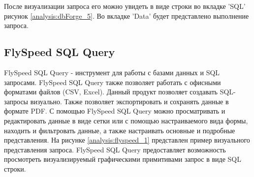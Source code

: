 \begin{figure}[ht!]
\end{figure}   

\newpage

После визуализации запроса его можно увидеть в виде строки во вкладке 'SQL' рисунок \ref{analysis:dbForge_5}. 
Во вкладке 'Data' будет представлено выполнение запроса.

\begin{figure}[ht!]
\end{figure}  

\newpage

\subsection{FlySpeed SQL Query}

FlySpeed SQL Query \cite{bib18} - инструмент для работы с базами данных и SQL запросами. 
FlySpeed SQL Query также позволяет работать с офисными форматами файлов (CSV, Excel). 
Данный продукт позволяет создавать SQL-запросы визуально. 
Также позволяет экспортировать и сохранять данные в формате PDF. 
С помощью FlySpeed SQL Query можно просматривать и редактировать данные в виде сетки или с помощью настраиваемого вида формы, 
находить и фильтровать данные, а также настраивать основные и подробные представления.
На рисунке \ref{analysis:flyspeed_1} представлен пример визуального представления запроса.
FlySpeed SQL Query предоставляет возможность просмотреть визуализируемый графическими примитивами запрос в виде SQL строки.  

